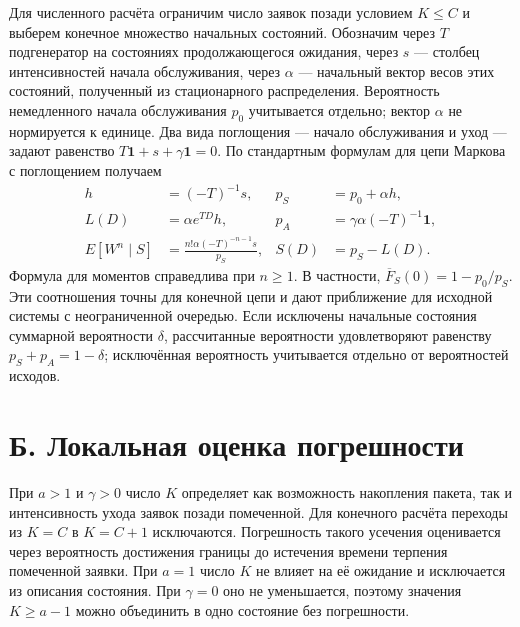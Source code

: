 Для численного расчёта ограничим число заявок позади условием $K\leq C$ и выберем конечное множество начальных состояний. Обозначим через $T$ подгенератор на состояниях продолжающегося ожидания, через $s$ --- столбец интенсивностей начала обслуживания, через $\alpha$ --- начальный вектор весов этих состояний, полученный из стационарного распределения. Вероятность немедленного начала обслуживания $p_0$ учитывается отдельно; вектор $\alpha$ не нормируется к единице. Два вида поглощения --- начало обслуживания и уход --- задают равенство $T\mathbf1+s+\gamma\mathbf1=0$. По стандартным формулам для цепи Маркова с поглощением получаем
\begin{align}
 h&=(-T)^{-1}s,& p_S&=p_0+\alpha h,\\
 L(D)&=\alpha e^{TD}h,& p_A&=\gamma\alpha(-T)^{-1}\mathbf1,\label{eq:ph}\\
 E[W^n\mid S]&=\frac{n!\alpha(-T)^{-n-1}s}{p_S},&
 S(D)&=p_S-L(D).
\end{align}
Формула для моментов справедлива при $n\geq1$. В частности, $\overline F_S(0)=1-p_0/p_S$. Эти соотношения точны для конечной цепи и дают приближение для исходной системы с неограниченной очередью. Если исключены начальные состояния суммарной вероятности $\delta$, рассчитанные вероятности удовлетворяют равенству $p_S+p_A=1-\delta$; исключённая вероятность учитывается отдельно от вероятностей исходов.

\section*{Б. Локальная оценка погрешности}

При $a>1$ и $\gamma>0$ число $K$ определяет как возможность накопления пакета, так и интенсивность ухода заявок позади помеченной. Для конечного расчёта переходы из $K=C$ в $K=C+1$ исключаются. Погрешность такого усечения оценивается через вероятность достижения границы до истечения времени терпения помеченной заявки. При $a=1$ число $K$ не влияет на её ожидание и исключается из описания состояния. При $\gamma=0$ оно не уменьшается, поэтому значения $K\geq a-1$ можно объединить в одно состояние без погрешности.

